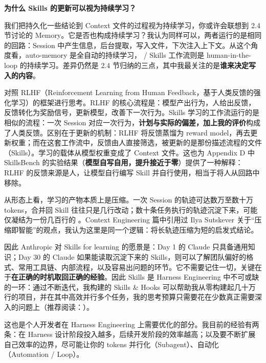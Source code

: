 \textbf{为什么 Skills 的更新可以视为持续学习？}

我们把持久化一些结论到 Context 文件的过程视为持续学习，你或许会联想到 2.4 节讨论的 Memory。它是否也构成持续学习？我认为同样可以，两者运行的是相同的回路：Session 中产生信息，后台提取，写入文件，下次注入上下文。从这个角度看，auto-memory 是全自动的持续学习， / Skills 工作流则是 human-in-the-loop 的持续学习。差异仍然是 2.4 节归纳的三点，其中我最关注的是\textbf{谁来决定写入的内容}。

对照 RLHF（Reinforcement Learning from Human Feedback，基于人类反馈的强化学习）的框架进行思考。RLHF 的核心流程是：模型产出行为，人给出反馈，反馈转化为奖励信号，更新模型，改善下一次行为。Skills 学习的工作流运行的是相似的流程：一次 Session 对应一次行为，\textbf{计划与实际的偏差，加上我的评价}构成了人类反馈。区别在于更新的机制：RLHF 将反馈蒸馏为 reward model，再去更新权重；而在这套工作流中，反馈由人直接筛选，被更新的是那份描述流程的文件（Skills）。学习的载体从模型权重变成了 Context 文件。这也为 Appendix D 中 SkillsBench 的实验结果（\textbf{模型自写自用，提升接近于零}）提供了一种解释：RLHF 的反馈来源是人，让模型自行编写 Skill 并自行使用，相当于将人从回路中移除。

从形态上看，学习的产物本质上是压缩。一次 Session 的轨迹可达数万至数十万 tokens，合并回 Skill 往往只是几行改动；数十条任务执行的轨迹沉淀下来，可能仅凝结为一份几百行的 。Context Engineering 篇中引用过 Ilya Sutskever 关于“压缩即智能”的观点，我认为这里是同一个逻辑：将长轨迹压缩为短的启发式结论。

因此 Anthropic 对 Skills for learning 的愿景是：Day 1 的 Claude 只具备通用知识；Day 30 的 Claude 如果能读取沉淀下来的 Skills，则可以了解团队偏好的格式、常用工具链、内部流程，以及容易出问题的环节。它不需要记住一切，关键在于\textbf{在正确的时机取回正确的经验}。因此 Skills 是 Harness Engineering 中不可或缺的一环：通过不断迭代，我构建的 Skills \& Hooks 可以帮助我从零构建起几十万行的项目，并在其中高效并行多个任务，我的思考预算只需要花在少数真正需要深入的问题上（推荐阅读：）。

\begin{tipbox}
这也是个人开发者在 Harness Engineering 上需要优化的部分。我目前的经验有两条：在 Harness 设计阶段投入越多，后续开发阶段的效率越高；以及要不断扩展自己效率的边界，尽可能让你的 tokens 并行化（Subagent）、自动化（Automation / Loop）。
\end{tipbox}
